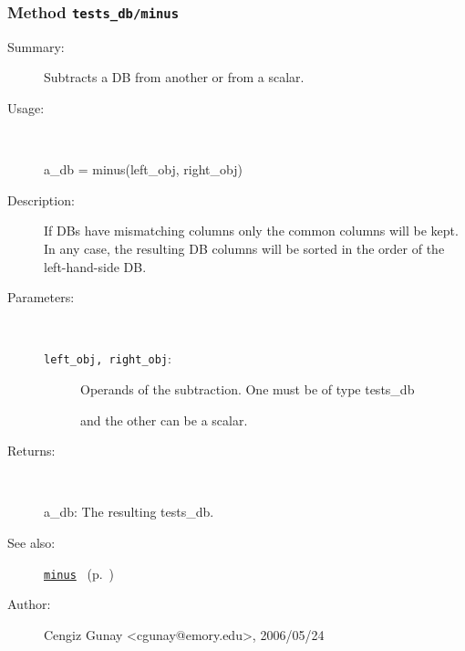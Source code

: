 \subsubsection[Method \texttt{minus}]{Method \texttt{tests\_db/minus}}%
%
\label{ref_tests_db__minus}%
\hypertarget{ref_tests_db__minus}{}%
\begin{description}
\item[Summary:]Subtracts a DB from another or from a scalar.
%
\item[Usage:]~%
\begin{lyxcode}%
a\_db = minus(left\_obj, right\_obj)
%
\end{lyxcode}%
%
\item[Description:]%
If DBs have mismatching columns only the common columns will be kept.
 In any case, the resulting DB columns will be sorted in the order of the
 left-hand-side DB.
\item[Parameters:]~
\begin{description}%
\item[\texttt{left\_obj, right\_obj}:]
 Operands of the subtraction. One must be of type tests\_db

and the other can be a scalar.
\end{description}%
%
\item[Returns:
]~

	a\_db: The resulting tests\_db.
%
%
\item[See also:]%
\hyperlink{ref_minus}{\texttt{minus}}%
\ (p.~\pageref{ref_minus})%
%
%
\item[Author:]%
Cengiz Gunay <cgunay@emory.edu>, 2006/05/24
%
\end{description}
\methodline%
